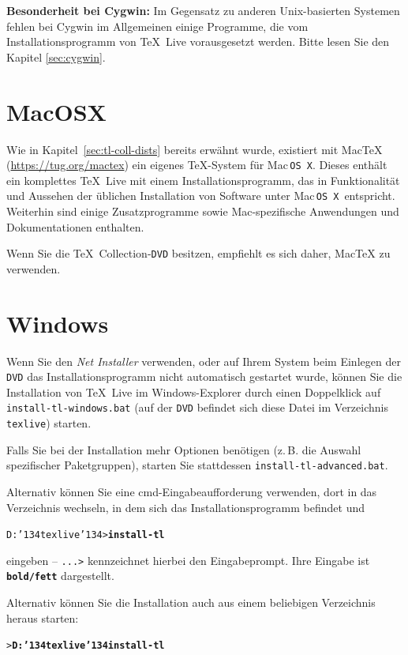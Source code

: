\documentclass[12pt,ngerman,a4paper,fullparskip]{scrreprt}
\newcommand{\TL}{\TeX\ Live\xspace}
\newcommand{\acro}[1]{\texttt{#1}}
\newcommand{\filename}[1]{\texttt{#1}}
\newcommand{\Ucom}[1]{\textbf{\texttt{#1}}}
\newcommand{\bs}{\protect\normalfont\ttfamily\char'134}
\def\TK{\TeX\ Collection}
\providecommand*{\DVD}{\acro{DVD}\xspace}
\providecommand*{\MacOSX}{Mac\,\acro{OS\,X}\xspace}
\begin{document}
\textbf{Besonderheit bei Cygwin:} Im Gegensatz zu anderen Unix-basierten
Systemen fehlen bei Cygwin im Allgemeinen einige Programme, die vom Installationsprogramm von \TL vorausgesetzt werden. Bitte lesen Sie den Kapitel \ref{sec:cygwin}.


\section{MacOSX}

Wie in Kapitel~\ref{sec:tl-coll-dists} bereits erwähnt wurde, existiert mit Mac\TeX{} (\url{https://tug.org/mactex}) ein eigenes \TeX-System für \MacOSX. Dieses enthält ein komplettes \TL mit einem Installationsprogramm, das in Funktionalität und Aussehen  der üblichen Installation von Software unter \MacOSX\ entspricht. Weiterhin sind einige Zusatzprogramme sowie Mac-spezifische Anwendungen und Dokumentationen enthalten.

Wenn Sie die \TK-\DVD besitzen, empfiehlt es sich daher, Mac\TeX{} zu verwenden.

\section{Windows}

Wenn Sie den \emph{Net Installer} verwenden, oder auf Ihrem System beim Einlegen der \DVD das Installationsprogramm nicht automatisch gestartet wurde, können Sie die Installation von \TL im Windows-Explorer durch einen Doppelklick auf \filename{install-tl-windows.bat} (auf der \DVD befindet sich diese Datei im Verzeichnis \texttt{texlive}) starten.

Falls Sie bei der Installation mehr Optionen benötigen (z.\,B. die Auswahl
spezifischer Paketgruppen), starten Sie stattdessen \filename{install-tl-advanced.bat}.

Alternativ können Sie eine cmd-Eingabeaufforderung verwenden, dort in das Verzeichnis wechseln, in dem sich das Installationsprogramm befindet und 

\begin{alltt}
D:\bs{}texlive\bs{}> \Ucom{install-tl}
\end{alltt}

eingeben -- \texttt{...>} kennzeichnet hierbei den Eingabeprompt. Ihre Eingabe ist \Ucom{\texttt{bold/fett}} dargestellt.

Alternativ können Sie die Installation auch aus einem beliebigen Verzeichnis heraus starten:

\begin{alltt}
> \Ucom{D:\bs{}texlive\bs{}install-tl}
\end{alltt}
\end{document}
